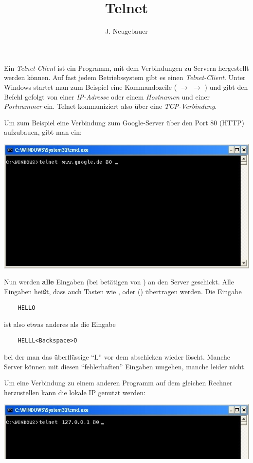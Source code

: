 \documentclass[10pt, a4paper]{scrartcl}
\author{J. Neugebauer}
\title{Telnet}
\date{\Heute}
\begin{document}
\ReiheTitel

Ein \emph{Telnet-Client} ist ein Programm, mit dem Verbindungen zu Servern hergestellt werden können. Auf fast jedem Betriebssystem gibt es einen \emph{Telnet-Client}. Unter Windows startet man zum Beispiel eine Kommandozeile ( $\rightarrow$  $\rightarrow$ ) und gibt den Befehl  gefolgt von einer \emph{IP-Adresse} oder einem \emph{Hostnamen} und einer \emph{Portnummer} ein. Telnet kommuniziert also über eine \emph{TCP-Verbindung}.

Um zum Beispiel eine Verbindung zum Google-Server über den Port 80 (HTTP) aufzubauen, gibt man ein:

\begin{center}
	\includegraphics[width=.8\textwidth]{Q2-GK-AB.II.5-Abb_cmd.png}
\end{center}

Nun werden \textbf{alle} Eingaben (bei betätigen von ) an den Server geschickt. Alle Eingaben heißt, dass auch Tasten wie , oder \taste{$\leftarrow$} () übertragen werden. Die Eingabe

\begin{verbatim}
	HELLO
\end{verbatim}

ist also etwas anderes als die Eingabe

\begin{verbatim}
	HELLL<Backspace>O
\end{verbatim}

bei der man das überflüssige \enquote{L} vor dem abschicken wieder löscht. Manche Server können mit diesen \enquote{fehlerhaften} Eingaben umgehen, manche leider nicht.

Um eine Verbindung zu einem anderen Programm auf dem gleichen Rechner herzustellen kann die lokale IP  genutzt werden:

\begin{center}
	\includegraphics[width=.8\textwidth]{Q2-GK-AB.II.5-Abb_home.png}
\end{center}
\end{document}
